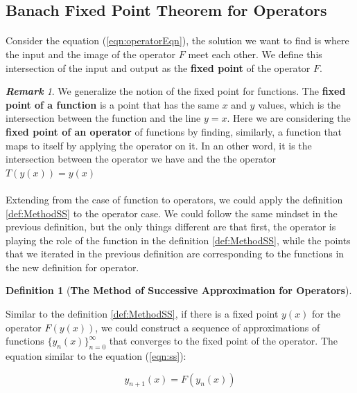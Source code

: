 \documentclass{article}
\theoremstyle{definition}
\newtheorem{definition}{Definition}[section]
\theoremstyle{remark}
\newtheorem*{remark}{\textbf{Remark}}
\begin{document}
\subsection{Banach Fixed Point Theorem for Operators}

\paragraph{  }

Consider the equation (\ref{eqn:operatorEqn}), the solution we want to find is where the input and the image of the operator $F$ meet each other. We define this intersection of the input and output as the \textbf{fixed point} of the operator $F$. 

\begin{remark}

We generalize the notion of the fixed point for functions. The \textbf{fixed point of a function} is a point that has the same $x$ and $y$ values, which is the intersection between the function and the line $y = x$. Here we are considering the \textbf{fixed point of an operator} of functions by finding, similarly, a function that maps to itself by applying the operator on it. In an other word, it is the intersection between the operator we have and the the operator $T(y(x)) = y(x)$

\end{remark}

\paragraph{  }

Extending from the case of function to operators, we could apply the definition \ref{def:MethodSS} to the operator case. We could follow the same mindset in the previous definition, but the only things different are that first, the operator is playing the role of the function in the definition \ref{def:MethodSS}, while the points that we iterated in the previous definition are corresponding to the functions in the new definition for operator.

\begin{definition}[\textbf{The Method of Successive Approximation for Operators}]\label{def:methodSSO}

Similar to the definition \ref{def:MethodSS}, if there is a fixed point $y(x)$ for the operator $F(y(x))$, we could construct a sequence of approximations of functions $\{y_n(x)\}_{n=0}^{\infty}$ that converges to the fixed point of the operator. The equation similar to the equation (\ref{eqn:ss}):

\begin{equation}\label{eqn:sso}
    y_{n+1}(x) = F(y_n(x))
\end{equation}

\end{definition}
\end{document}
